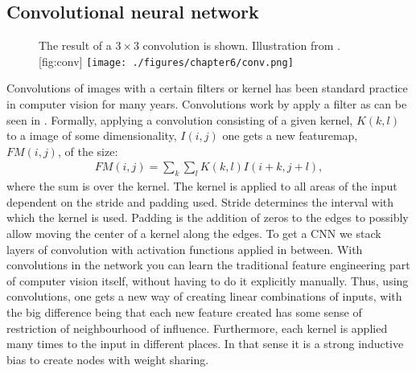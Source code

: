 \subsection{Convolutional neural network}
\begin{figure}[h]
	\begin{sidecaption}[Conv.]{The result of a $3 \times 3$ convolution is shown. Illustration from \cite{podareanuBestPracticeGuide}. }[fig:conv]
		\antimpjustification
		\centering
		\texttt{[image: ./figures/chapter6/conv.png]}
	\end{sidecaption}
\end{figure}
Convolutions of images with a certain filters or kernel has been standard practice in computer vision for many years. 
Convolutions work by apply a filter as can be seen in . Formally, applying a convolution consisting of a given kernel, $K(k,l)$ to a image of some dimensionality, $I(i,j)$ one gets a new featuremap, $FM(i,j)$, of the size:
\begin{align}
	FM(i,j) = \sum_{k} \sum_{l} K(k,l) I(i+k, j +l),
\end{align}
where the sum is over the kernel.
The kernel is applied to all areas of the input dependent on the stride and padding used.
Stride determines the interval with which the kernel is used.
Padding is the addition of zeros to the edges to possibly allow moving the center of a kernel along the edges.
To get a \ac{CNN} we stack layers of convolution with activation functions applied in between.
With convolutions in the network you can learn the traditional feature engineering part of computer vision itself, without having to do it explicitly manually.
Thus, using convolutions, one gets a new way of creating linear combinations of inputs, with the big difference being that each new feature created has some sense of restriction of neighbourhood of influence. 
Furthermore, each kernel is applied many times to the input in different places.
In that sense it is a strong inductive bias to create nodes with weight sharing. \cite[see][chapter 9]{goodfellowDeepLearning2016} 
